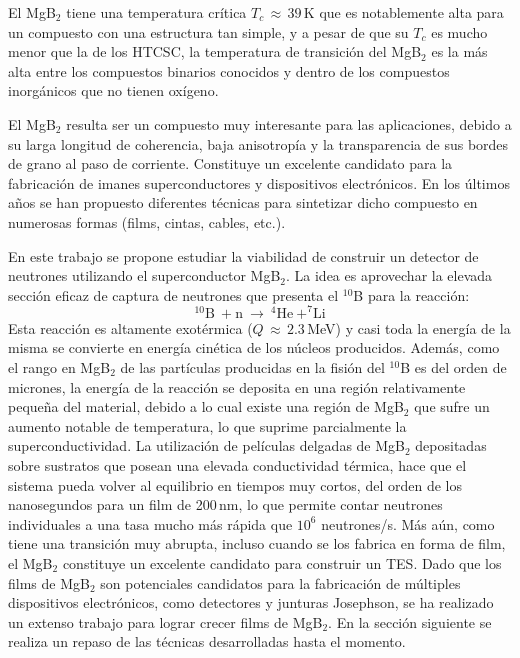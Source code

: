 El MgB$_2$ tiene una temperatura crítica $T_c \, \approx \, 39$\,K que es notablemente alta para un compuesto con una estructura tan simple, y a pesar de que su $T_c$ es mucho menor que la de los HTCSC\cite{Buzea2001}, la temperatura de transición del MgB$_2$ es la más alta entre los compuestos binarios conocidos y dentro de los compuestos inorgánicos que no tienen oxígeno\cite{Vaglio2002}.

El MgB$_2$ resulta ser un compuesto muy interesante para las aplicaciones, debido a su larga longitud de coherencia, baja anisotropía y la transparencia de sus bordes de grano al paso de corriente. Constituye un excelente candidato para la fabricación de imanes superconductores y dispositivos electrónicos\cite{Buzea2001, Vinod2010}. En los últimos años se han propuesto diferentes técnicas para sintetizar dicho compuesto en numerosas formas (films, cintas, cables, etc.)\cite{Buzea2001,Vinod2010,Vaglio2002,Naito2004}.

En este trabajo se propone estudiar la viabilidad de construir un detector de neutrones utilizando el superconductor MgB$_2$. La idea es aprovechar la elevada sección eficaz de captura de neutrones que presenta el $^{10}$B para la reacción\cite{secceff}:
\begin{equation}
  ^{10}\text{B} \ + \text{n} \ \rightarrow \ ^{4}\text{He} \ + ^{7}\text{Li}
  \label{eq:reaccion}
\end{equation}
\noindent
Esta reacción es altamente exotérmica ($Q\,\approx\,2.3$\,MeV) y casi toda la energía de la misma se convierte en energía cinética de los núcleos producidos\cite{Satoh2003}. Además, como el rango en MgB$_2$ de las partículas producidas en la fisión del $^{10}$B es del orden de micrones\cite{Nishikawa2008}, la energía de la reacción se deposita en una región relativamente pequeña del material, debido a lo cual existe una región de MgB$_2$ que sufre un aumento notable de temperatura, lo que suprime parcialmente la superconductividad\cite{Satoh2003,Ishida2007,Miki2006}. La utilización de películas delgadas de MgB$_2$ depositadas sobre sustratos que posean una elevada conductividad térmica, hace que el sistema pueda volver al equilibrio en tiempos muy cortos, del orden de los nanosegundos para un film de 200\,nm\cite{Nishikawa2008, Ishida2007}, lo que permite contar neutrones individuales a una tasa mucho más rápida que $10^6$ neutrones/s\cite{Ishida2007}. Más aún, como tiene una transición muy abrupta\cite{Buzea2001,Nagamatsu2001}, incluso cuando se los fabrica en forma de film, el MgB$_2$ constituye un excelente candidato para construir un TES\cite{Nishikawa2008}. Dado que los films de MgB$_2$ son potenciales candidatos para la fabricación de múltiples dispositivos electrónicos, como detectores y junturas Josephson, se ha realizado un extenso trabajo para lograr crecer films de MgB$_{2}$. En la sección siguiente se realiza un repaso de las técnicas desarrolladas hasta el momento.
